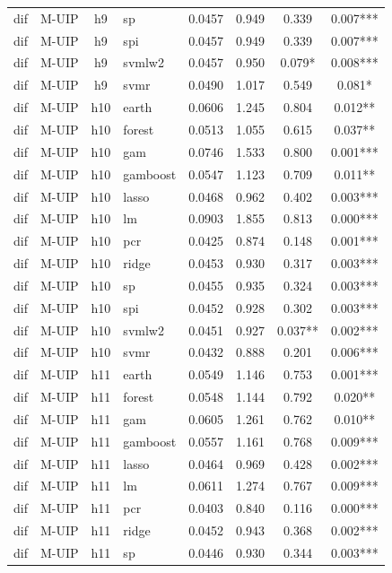 \begin{ThreePartTable}
\begin{longtable}[t]{llclcccc}
dif & M-UIP & h9 & sp & 0.0457 & 0.949 & 0.339 & 0.007***\\
dif & M-UIP & h9 & spi & 0.0457 & 0.949 & 0.339 & 0.007***\\
dif & M-UIP & h9 & svmlw2 & 0.0457 & 0.950 & 0.079* & 0.008***\\
dif & M-UIP & h9 & svmr & 0.0490 & 1.017 & 0.549 & 0.081*\\
\addlinespace
dif & M-UIP & h10 & earth & 0.0606 & 1.245 & 0.804 & 0.012**\\
dif & M-UIP & h10 & forest & 0.0513 & 1.055 & 0.615 & 0.037**\\
dif & M-UIP & h10 & gam & 0.0746 & 1.533 & 0.800 & 0.001***\\
dif & M-UIP & h10 & gamboost & 0.0547 & 1.123 & 0.709 & 0.011**\\
dif & M-UIP & h10 & lasso & 0.0468 & 0.962 & 0.402 & 0.003***\\
dif & M-UIP & h10 & lm & 0.0903 & 1.855 & 0.813 & 0.000***\\
dif & M-UIP & h10 & pcr & 0.0425 & 0.874 & 0.148 & 0.001***\\
dif & M-UIP & h10 & ridge & 0.0453 & 0.930 & 0.317 & 0.003***\\
dif & M-UIP & h10 & sp & 0.0455 & 0.935 & 0.324 & 0.003***\\
dif & M-UIP & h10 & spi & 0.0452 & 0.928 & 0.302 & 0.003***\\
dif & M-UIP & h10 & svmlw2 & 0.0451 & 0.927 & 0.037** & 0.002***\\
dif & M-UIP & h10 & svmr & 0.0432 & 0.888 & 0.201 & 0.006***\\
\addlinespace
dif & M-UIP & h11 & earth & 0.0549 & 1.146 & 0.753 & 0.001***\\
dif & M-UIP & h11 & forest & 0.0548 & 1.144 & 0.792 & 0.020**\\
dif & M-UIP & h11 & gam & 0.0605 & 1.261 & 0.762 & 0.010**\\
dif & M-UIP & h11 & gamboost & 0.0557 & 1.161 & 0.768 & 0.009***\\
dif & M-UIP & h11 & lasso & 0.0464 & 0.969 & 0.428 & 0.002***\\
dif & M-UIP & h11 & lm & 0.0611 & 1.274 & 0.767 & 0.009***\\
dif & M-UIP & h11 & pcr & 0.0403 & 0.840 & 0.116 & 0.000***\\
dif & M-UIP & h11 & ridge & 0.0452 & 0.943 & 0.368 & 0.002***\\
dif & M-UIP & h11 & sp & 0.0446 & 0.930 & 0.344 & 0.003***\\

\end{longtable}
\end{ThreePartTable}

